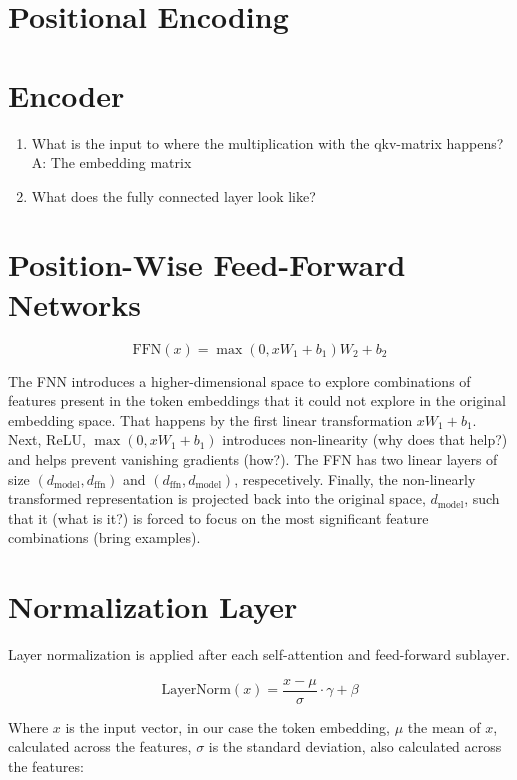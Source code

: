 \documentclass{article}
\begin{document}
\section{Positional Encoding}

\section{Encoder}
\begin{enumerate}
	\item What is the input to where the multiplication with the qkv-matrix happens? A: The embedding matrix
	\item What does the fully connected layer look like?
\end{enumerate}

\section{Position-Wise Feed-Forward Networks}

\begin{equation}
	\text{FFN}(x) = \max(0, xW_1 + b_1)W_2 + b_2
\end{equation}

The FNN introduces a higher-dimensional space to explore combinations of features present in the token embeddings that it could not explore in the original embedding space. That happens by the first linear transformation \(xW_1 + b_1\). Next, ReLU, \(\max(0, xW_1 + b_1)\) introduces non-linearity (why does that help?) and helps prevent vanishing gradients (how?). The FFN has two linear layers of size \(\left(d_{\text{model}}, d_{\text{ffn}}\right)\) and \(\left(d_{\text{ffn}}, d_{\text{model}}\right)\), respecetively.
Finally, the non-linearly transformed representation is projected back into the original space, \(d_{\text{model}}\), such that it (what is it?) is forced to focus on the most significant feature combinations (bring examples).

\section{Normalization Layer}
Layer normalization is applied after each self-attention and feed-forward sublayer.

\begin{equation}
	\text{LayerNorm}(x) = \frac{x - \mu}{\sigma} \cdot \gamma + \beta
\end{equation}

Where \(x\) is the input vector, in our case the token embedding, \(\mu\) the mean of \(x\), calculated across the features, \(\sigma\) is the standard deviation, also calculated across the features:
\end{document}
